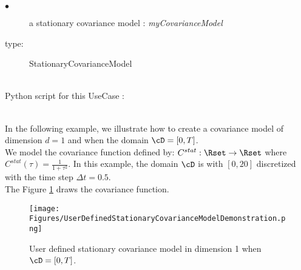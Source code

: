 {
  \begin{description}
  \item[$\bullet$] a stationary covariance model : {\itshape myCovarianceModel}
  \item[type:] StationaryCovarianceModel
  \end{description}

}

\textspace\\
Python script for this UseCase :


\textspace\\




In the following example, we illustrate how to create a covariance model of dimension $d=1$ and when the domain $\cD=[0,T]$.\\
We model the covariance function defined by: $C^{stat}:\Rset \rightarrow  \Rset$ where $C^{stat}(\tau) = \frac{1}{1 + \tau^2} $. In this example, the domain $\cD$ is with $[0,20]$ discretized with the time step $\Delta t = 0.5$.\\


The Figure \ref{UserDefinedStationaryCovarianceModelDemonstration} draws the covariance function.

\begin{figure}[H]
  \begin{center}
    \texttt{[image: Figures/UserDefinedStationaryCovarianceModelDemonstration.png]}
    \caption{User defined stationary covariance model in dimension 1 when $\cD=[0,T]$.}
    \label{UserDefinedStationaryCovarianceModelDemonstration}
  \end{center}
\end{figure}
